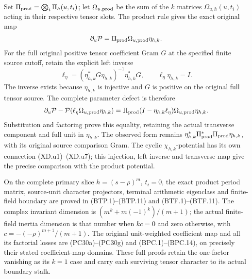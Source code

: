 Set \(\Pi_{\rm prod}=\bigotimes_i\Pi_h(u,t_i)\); let
\(\Omega_{u,\rm prod}\) be the sum of the \(k\) matrices
\(\Omega_{u,h}(u,t_i)\) acting in their respective tensor slots.
The product rule gives the exact original map
\[
 \partial_u\mathcal P
       =\Pi_{\rm prod}\Omega_{u,\rm prod}\eta_{h,k}.
\]
For the full original positive tensor coefficient Gram \(G\)
at the specified finite source cutoff, retain the explicit left
inverse
\[
 \ell_\eta=(\eta_{h,k}^*G\eta_{h,k})^{-1}\eta_{h,k}^*G,\qquad
 \ell_\eta\eta_{h,k}=I.
\]
The inverse exists because \(\eta_{h,k}\) is injective and \(G\)
is positive on the original full tensor source. The complete
parameter defect is therefore
\[
 \partial_u\mathcal P-\mathcal P
              (\ell_\eta\Omega_{u,\rm prod}\eta_{h,k})
   =\Pi_{\rm prod}(I-\eta_{h,k}\ell_\eta)
                  \Omega_{u,\rm prod}\eta_{h,k}.
\]
Substitution and factoring prove this equality, retaining the
actual transverse component and full unit in \(\eta_{h,k}\).
The observed form remains
\(\eta_{h,k}^*\Pi_{\rm prod}^*\Pi_{\rm prod}\eta_{h,k}\),
with its original source comparison Gram. The cyclic
\(\chi_{h,k}\)-potential has its own connection (XD.u1)--(XD.u7);
this injection, left inverse and transverse map give the precise
comparison with the product potential.

On the complete primary slice \(h=(s-\rho)^m\), \(t_i=0\), the
exact product period matrix, source-unit character projectors,
terminal arithmetic eigenclass and finite-field boundary are
proved in (BTP.1)--(BTP.11) and (BTF.1)--(BTF.11). The complex
invariant dimension is \((m^k+m(-1)^k)/(m+1)\); the actual
finite-field inertia dimension is that number when \(kc=0\)
and zero otherwise, with \(c=-(-\rho)^{m+1}/(m+1)\).
The original unit-weighted coefficient map and all its factorial
losses are (PC30a)--(PC30g) and (BPC.1)--(BPC.14), on precisely
their stated coefficient-map domains. These full proofs retain
the one-factor vanishing as its \(k=1\) case and carry each
surviving tensor character to its actual boundary stalk.

